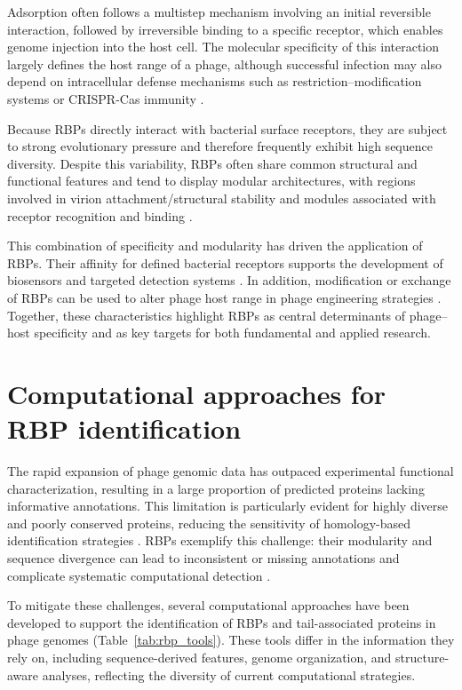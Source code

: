 \documentclass[runningheads]{llncs}
\begin{document}
Adsorption often follows a multistep mechanism involving an initial reversible interaction, followed by irreversible binding to a specific receptor, which enables genome injection into the host cell. The molecular specificity of this interaction largely defines the host range of a phage, although successful infection may also depend on intracellular defense mechanisms such as restriction--modification systems or CRISPR-Cas immunity \cite{silva2016,labrie2010}.

Because RBPs directly interact with bacterial surface receptors, they are subject to strong evolutionary pressure and therefore frequently exhibit high sequence diversity. Despite this variability, RBPs often share common structural and functional features and tend to display modular architectures, with regions involved in virion attachment/structural stability and modules associated with receptor recognition and binding \cite{latka2019,latka2017}.

This combination of specificity and modularity has driven the application of RBPs. Their affinity for defined bacterial receptors supports the development of biosensors and targeted detection systems \cite{costa2022,klumpp2023}. In addition, modification or exchange of RBPs can be used to alter phage host range in phage engineering strategies \cite{santos2018,klumpp2023}. Together, these characteristics highlight RBPs as central determinants of phage--host specificity and as key targets for both fundamental and applied research.

\section{Computational approaches for RBP identification}

The rapid expansion of phage genomic data has outpaced experimental functional characterization, resulting in a large proportion of predicted proteins lacking informative annotations. This limitation is particularly evident for highly diverse and poorly conserved proteins, reducing the sensitivity of homology-based identification strategies \cite{hatfull2015,cantu2020}. RBPs exemplify this challenge: their modularity and sequence divergence can lead to inconsistent or missing annotations and complicate systematic computational detection \cite{latka2019,boeckaerts2022}.

To mitigate these challenges, several computational approaches have been developed to support the identification of RBPs and tail-associated proteins in phage genomes (Table~\ref{tab:rbp_tools}). These tools differ in the information they rely on, including sequence-derived features, genome organization, and structure-aware analyses, reflecting the diversity of current computational strategies.
\end{document}
